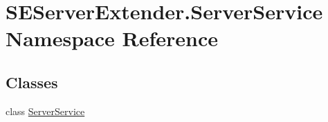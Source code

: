 \hypertarget{namespace_s_e_server_extender_1_1_server_service}{}\section{S\+E\+Server\+Extender.\+Server\+Service Namespace Reference}
\label{namespace_s_e_server_extender_1_1_server_service}
\subsection*{Classes}
\begin{DoxyCompactItemize}
\item 
class \hyperlink{class_s_e_server_extender_1_1_server_service_1_1_server_service}{Server\+Service}
\end{DoxyCompactItemize}
